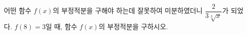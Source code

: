 어떤 함수 $f(x)$의 부정적분을 구해야 하는데 잘못하여 미분하였더니 $\dfrac{2}{3\sqrt[3]{x}}$가 되었다. $f(8)=3$일 때, 함수 $f(x)$의 부정적분을 구하시오.
